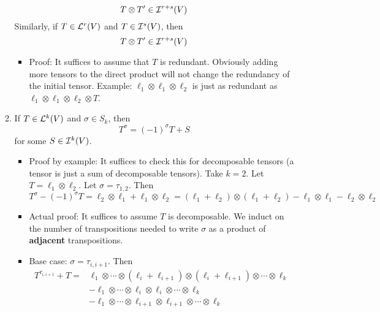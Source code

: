 \documentclass[../notes.tex]{subfiles}
\begin{document}
\begin{itemize}
\begin{enumerate}
        \begin{equation*}
            T\otimes T'\in\ide[r+s]{V}
        \end{equation*}
        Similarly, if $T\in\lin[r]{V}$ and $T\in\ide[s]{V}$, then
        \begin{equation*}
            T\otimes T'\in\ide[r+s]{V}
        \end{equation*}
        \begin{itemize}
            \item Proof: It suffices to assume that $T$ is redundant. Obviously adding more tensors to the direct product will not change the redundancy of the initial tensor. Example: $\ell_1\otimes\ell_1\otimes\ell_2$ is just as redundant as $\ell_1\otimes\ell_1\otimes\ell_2\otimes T$.
        \end{itemize}
        \item If $T\in\lin[k]{V}$ and $\sigma\in S_k$, then
        \begin{equation*}
            T^\sigma = (-1)^\sigma T+S
        \end{equation*}
        for some $S\in\ide[k]{V}$.
        \begin{itemize}
            \item Proof by example: It suffices to check this for decomposable tensors (a tensor is just a sum of decomposable tensors). Take $k=2$. Let $T=\ell_1\otimes\ell_2$. Let $\sigma=\tau_{1,2}$. Then
            \begin{equation*}
                T^\sigma-(-1)^\sigma T = \ell_2\otimes\ell_1+\ell_1\otimes\ell_2
                = (\ell_1+\ell_2)\otimes(\ell_1+\ell_2)-\ell_1\otimes\ell_1-\ell_2\otimes\ell_2
            \end{equation*}
            \item Actual proof: It suffices to assume $T$ is decomposable. We induct on the number of transpositions needed to write $\sigma$ as a product of \textbf{adjacent} transpositions.
            \item Base case: $\sigma=\tau_{i,i+1}$. Then
            \begin{equation*}
                \begin{split}
                    T^{\tau_{i,i+1}}+T ={}& \ell_1\otimes\cdots\otimes(\ell_i+\ell_{i+1})\otimes(\ell_i+\ell_{i+1})\otimes\cdots\otimes\ell_k\\
                    &-\ell_1\otimes\cdots\otimes\ell_i\otimes\ell_i\otimes\cdots\otimes\ell_k\\
                    &-\ell_1\otimes\cdots\otimes\ell_{i+1}\otimes\ell_{i+1}\otimes\cdots\otimes\ell_k

\end{split}
\end{equation*}
\end{itemize}
\end{enumerate}
\end{itemize}
\end{document}
